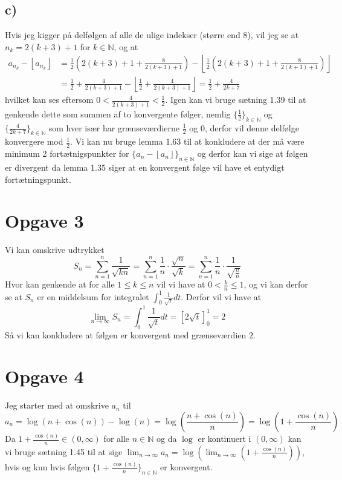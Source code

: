 \documentclass{article}
\newcommand{\m}[1]{\mathbb{#1}}
\newcommand{\mN}{\m{N}}
\newcommand{\floor}[1]{\left\lfloor #1\right\rfloor}
\begin{document}
\subsection*{c)}
Hvis jeg kigger på delfølgen af alle de ulige indekser (større end 8), vil jeg se at $n_k = 2(k+3)+1 $ for $k \in \mN$, og at
\begin{align*}
    a_{n_k} - \floor{a_{n_k}} &= \frac{1}{2} (2(k+3) + 1 + \frac{8}{2(k+3)+1}) - \floor{\frac{1}{2} (2(k+3) + 1 + \frac{8}{2(k+3)+1})}  \\
    &= \frac{1}{2} + \frac{4}{2(k+3)+1} - \floor{\frac{1}{2} + \frac{4}{2(k+3)+1}} = \frac{1}{2} + \frac{4}{2k+7} 
\end{align*}
hvilket kan ses eftersom $ 0 < \frac{4}{2(k+3)+1} < \frac{1}{2}$.
Igen kan vi bruge sætning 1.39 til at genkende dette som summen af to konvergente følger, nemlig $\{ \frac{1}{2} \}_{k \in \mN}$ og 
$\{ \frac{4}{2k+7} \}_{k \in \mN}$ som hver især har grænseværdierne $\frac{1}{2}$ og $0$, derfor vil denne delfølge konvergere mod $\frac{1}{2}$.
Vi kan nu bruge lemma 1.63 til at konkludere at der må være minimum 2 fortætnigspunkter for $\{ a_n - \floor{a_n} \}_{n \in \mN}$ og derfor kan vi sige at
følgen er divergent da lemma 1.35 siger at en konvergent følge vil have et entydigt fortætningspunkt.


\section*{Opgave 3}
Vi kan omskrive udtrykket
\[
S_n = \sum_{n=1}^n \frac{1}{\sqrt{kn}} =
 \sum_{n=1}^n \frac{1}{n} \cdot \frac{\sqrt{n}}{\sqrt{k}} =
 \sum_{n=1}^n \frac{1}{n} \cdot \frac{1}{\sqrt{\frac{n}{n}}}
\]
Hvor kan genkende at for alle $1 \le k \le n$ vil vi have at $0 < \frac{k}{n} \le 1$, og
vi kan derfor se at $S_n$ er en middelsum for integralet 
$ \int_{0}^1 \frac{1}{\sqrt{t}} dt$. Derfor vil vi have at 
\[
    \lim_{n \to \infty} S_n = \int_{0}^1 \frac{1}{\sqrt{t}} dt 
    = \left[ 2\sqrt{t} \right]_{0}^1 = 2
\]
Så vi kan konkludere at følgen er konvergent med grænseværdien $2$.

\section*{Opgave 4}
Jeg starter med at omskrive $a_n$ til
\[
    a_n = \log(n + \cos(n)) - \log(n) =
    \log(\frac{n + \cos(n)}{n}) = \log(1 + \frac{\cos(n)}{n})
\]
Da $ 1 + \frac{\cos(n)}{n} \in (0, \infty)$ for alle $n \in \mN$ og da $\log$ er kontinuert i $(0, \infty)$ kan vi bruge sætning 1.45
til at sige $ \lim_{n \to \infty} a_n = \log( \lim_{n \to \infty} (1 + \frac{\cos(n)}{n}))$, 
hvis og kun hvis følgen
$\{1 + \frac{\cos(n)}{n} \}_{n \in \mN}$ er konvergent. 
\end{document}
